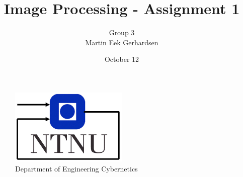 \documentclass[11pt, a4paper, USenglish]{article} %
\begin{document}
\title{Image Processing - Assignment 1}
\author{Group 3\\Martin Eek Gerhardsen}
\date{October 12}
\begin{titlepage}
    \maketitle
    \begin{figure}
    \centering
    \includegraphics[width=0.5\textwidth]{figures/itk_ntnu}\\
    Department of Engineering Cybernetics
    \end{figure}
    \thispagestyle{empty}
\end{titlepage}

\newpage
\tableofcontents
\thispagestyle{empty} %

\newpage
\setcounter{page}{1}




\newpage
{}
\printbibliography{}
\label{sec:bibliography}
\end{document}

